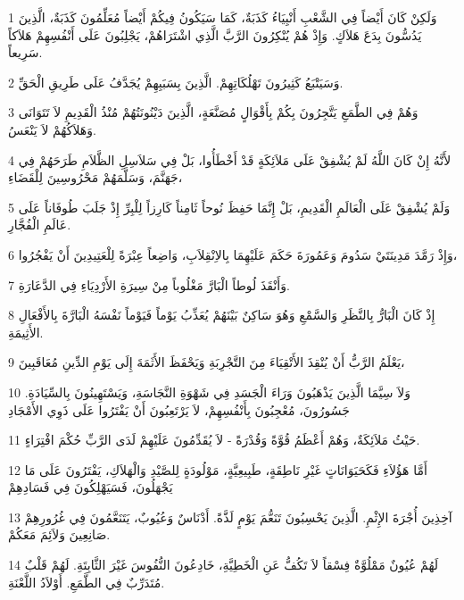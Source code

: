 \par 1 وَلَكِنْ كَانَ أَيْضاً فِي الشَّعْبِ أَنْبِيَاءُ كَذَبَةٌ، كَمَا سَيَكُونُ فِيكُمْ أَيْضاً مُعَلِّمُونَ كَذَبَةٌ، الَّذِينَ يَدُسُّونَ بِدَعَ هَلاَكٍ. وَإِذْ هُمْ يُنْكِرُونَ الرَّبَّ الَّذِي اشْتَرَاهُمْ، يَجْلِبُونَ عَلَى أَنْفُسِهِمْ هَلاَكاً سَرِيعاً.
\par 2 وَسَيَتْبَعُ كَثِيرُونَ تَهْلُكَاتِهِمْ. الَّذِينَ بِسَبَبِهِمْ يُجَدَّفُ عَلَى طَرِيقِ الْحَقِّ.
\par 3 وَهُمْ فِي الطَّمَعِ يَتَّجِرُونَ بِكُمْ بِأَقْوَالٍ مُصَنَّعَةٍ، الَّذِينَ دَيْنُونَتُهُمْ مُنْذُ الْقَدِيمِ لاَ تَتَوَانَى وَهَلاَكُهُمْ لاَ يَنْعَسُ.
\par 4 لأَنَّهُ إِنْ كَانَ اللَّهُ لَمْ يُشْفِقْ عَلَى مَلاَئِكَةٍ قَدْ أَخْطَأُوا، بَلْ فِي سَلاَسِلِ الظَّلاَمِ طَرَحَهُمْ فِي جَهَنَّمَ، وَسَلَّمَهُمْ مَحْرُوسِينَ لِلْقَضَاءِ،
\par 5 وَلَمْ يُشْفِقْ عَلَى الْعَالَمِ الْقَدِيمِ، بَلْ إِنَّمَا حَفِظَ نُوحاً ثَامِناً كَارِزاً لِلْبِرِّ إِذْ جَلَبَ طُوفَاناً عَلَى عَالَمِ الْفُجَّارِ.
\par 6 وَإِذْ رَمَّدَ مَدِينَتَيْ سَدُومَ وَعَمُورَةَ حَكَمَ عَلَيْهِمَا بِالاِنْقِلاَبِ، وَاضِعاً عِبْرَةً لِلْعَتِيدِينَ أَنْ يَفْجُرُوا،
\par 7 وَأَنْقَذَ لُوطاً الْبَارَّ مَغْلُوباً مِنْ سِيرَةِ الأَرْدِيَاءِ فِي الدَّعَارَةِ.
\par 8 إِذْ كَانَ الْبَارُّ بِالنَّظَرِ وَالسَّمْعِ وَهُوَ سَاكِنٌ بَيْنَهُمْ يُعَذِّبُ يَوْماً فَيَوْماً نَفْسَهُ الْبَارَّةَ بِالأَفْعَالِ الأَثِيمَةِ.
\par 9 يَعْلَمُ الرَّبُّ أَنْ يُنْقِذَ الأَتْقِيَاءَ مِنَ التَّجْرِبَةِ وَيَحْفَظَ الأَثَمَةَ إِلَى يَوْمِ الدِّينِ مُعَاقَبِينَ،
\par 10 وَلاَ سِيَّمَا الَّذِينَ يَذْهَبُونَ وَرَاءَ الْجَسَدِ فِي شَهْوَةِ النَّجَاسَةِ، وَيَسْتَهِينُونَ بِالسِّيَادَةِ. جَسُورُونَ، مُعْجِبُونَ بِأَنْفُسِهِمْ، لاَ يَرْتَعِبُونَ أَنْ يَفْتَرُوا عَلَى ذَوِي الأَمْجَادِ
\par 11 حَيْثُ مَلاَئِكَةٌ، وَهُمْ أَعْظَمُ قُوَّةً وَقُدْرَةً - لاَ يُقَدِّمُونَ عَلَيْهِمْ لَدَى الرَّبِّ حُكْمَ افْتِرَاءٍ.
\par 12 أَمَّا هَؤُلاَءِ فَكَحَيَوَانَاتٍ غَيْرِ نَاطِقَةٍ، طَبِيعِيَّةٍ، مَوْلُودَةٍ لِلصَّيْدِ وَالْهَلاَكِ، يَفْتَرُونَ عَلَى مَا يَجْهَلُونَ، فَسَيَهْلِكُونَ فِي فَسَادِهِمْ
\par 13 آخِذِينَ أُجْرَةَ الإِثْمِ. الَّذِينَ يَحْسِبُونَ تَنَعُّمَ يَوْمٍ لَذَّةً. أَدْنَاسٌ وَعُيُوبٌ، يَتَنَعَّمُونَ فِي غُرُورِهِمْ صَانِعِينَ وَلاَئِمَ مَعَكُمْ.
\par 14 لَهُمْ عُيُونٌ مَمْلُوَّةٌ فِسْقاً لاَ تَكُفُّ عَنِ الْخَطِيَّةِ، خَادِعُونَ النُّفُوسَ غَيْرَ الثَّابِتَةِ. لَهُمْ قَلْبٌ مُتَدَرِّبٌ فِي الطَّمَعِ. أَوْلاَدُ اللَّعْنَةِ.
